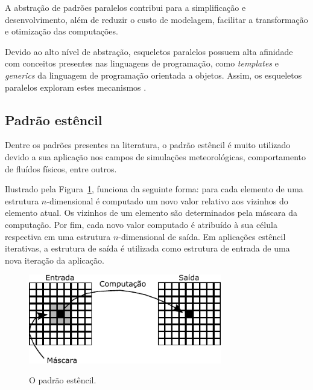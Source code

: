 A abstração de padrões paralelos contribui para a simplificação e desenvolvimento, além de reduzir o custo de modelagem, facilitar a transformação e otimização das computações.

Devido ao alto nível de abstração, esqueletos paralelos possuem alta afinidade com conceitos presentes nas linguagens de programação, como \textit{templates} e \textit{generics} da linguagem de programação orientada a objetos. Assim, os esqueletos paralelos exploram estes mecanismos \cite{Gorlatch2011}.

\subsection{Padrão estêncil}
\label{subsec:stencil}

Dentre os padrões presentes na literatura, o padrão estêncil é muito utilizado devido a sua aplicação nos campos de simulações meteorológicas, comportamento de fluídos físicos, entre outros.

Ilustrado pela Figura~\ref{fig:stencil}, funciona da seguinte forma: para cada elemento de uma estrutura $n$-dimensional é computado um novo valor relativo aos vizinhos do elemento atual. Os vizinhos de um elemento são determinados pela máscara da computação. Por fim, cada novo valor computado é atribuído à sua célula respectiva em uma estrutura $n$-dimensional de saída. Em aplicações estêncil iterativas, a estrutura de saída é utilizada como estrutura de entrada de uma nova iteração da aplicação.

\begin{figure}
    \centering
    \caption{O padrão estêncil.}
    \includegraphics[width=0.75\textwidth]{figs/stencilComputation.pdf} \\
    \label{fig:stencil}
\end{figure}

\section{\pskel}


